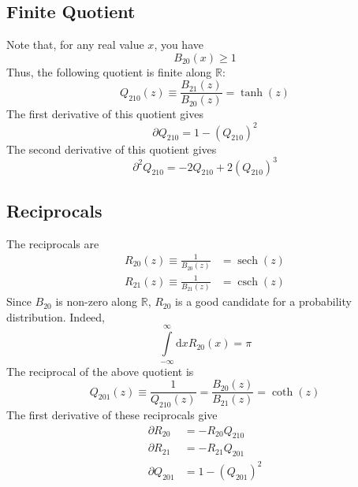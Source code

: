 \subsection{Finite Quotient}
Note that, for any real value $x$, you have
\begin{equation}
    B_{20}(x) \geq 1
\end{equation}
Thus, the following quotient is finite along $\mathbb{R}$:
\begin{equation}
    Q_{210}(z) \equiv \frac{B_{21}(z)}{B_{20}(z)} = \tanh(z)
\end{equation}
The first derivative of this quotient gives
\begin{equation}
    \partial Q_{210} = 1 - \left( Q_{210} \right)^{2}
\end{equation}
The second derivative of this quotient gives
\begin{equation}
    \partial^{2} Q_{210} = -2 Q_{210} + 2\left( Q_{210} \right)^{3}
\end{equation}
\subsection{Reciprocals}
The reciprocals are
\begin{align}
    R_{20}(z) \equiv \frac{1}{B_{20}(z)} &= \operatorname{sech}(z) \\
    R_{21}(z) \equiv \frac{1}{B_{21}(z)} &= \operatorname{csch}(z)
\end{align}
Since $B_{20}$ is non-zero along $\mathbb{R}$, $R_{20}$ is a good candidate for a probability distribution. Indeed,
\begin{equation}
    \int\limits_{-\infty}^{\infty} \mathrm{d}x R_{20}(x) = \pi
\end{equation}
The reciprocal of the above quotient is
\begin{equation}
    Q_{201}(z) \equiv \frac{1}{Q_{210}(z)} = \frac{B_{20}(z)}{B_{21}(z)} = \operatorname{coth}(z)
\end{equation}
The first derivative of these reciprocals give
\begin{align}
    \partial R_{20} &= -R_{20} Q_{210} \\
    \partial R_{21} &= -R_{21} Q_{201} \\
    \partial Q_{201} &= 1 - \left( Q_{201} \right)^{2}
\end{align}
